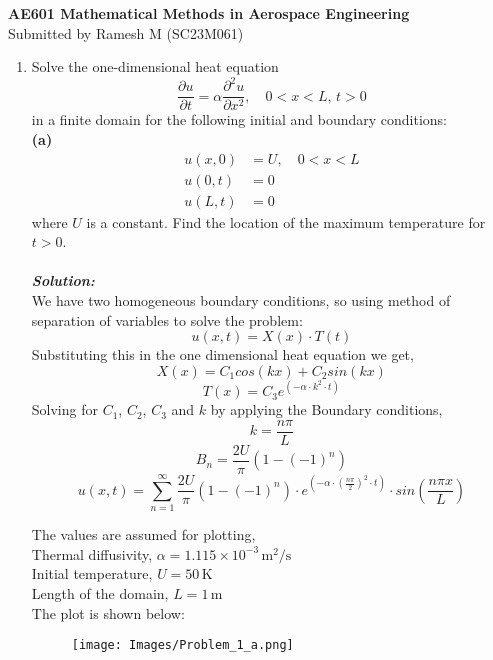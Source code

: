 \documentclass[]{article}
\theoremstyle{definition}
\begin{document}
\begin{center}
{\textbf{\Large AE601 Mathematical Methods in Aerospace Engineering}}\\

\normalsize{Submitted by Ramesh M (SC23M061)}\\
\end{center}

\vspace{0.2 cm}

\begin{enumerate}
\item 
Solve the one-dimensional heat equation
\[
\frac{\partial u}{\partial t} = \alpha \frac{\partial^2 u}{\partial x^2}, \quad 0 < x < L, \, t > 0
\]
in a finite domain for the following initial and boundary conditions:\\
\textbf{(a)}\quad
\begin{align*}
u(x,0) &= U, \quad 0 < x < L \\
u(0,t) &= 0 \\
u(L,t) &= 0
\end{align*}
where \(U\) is a constant. Find the location of the maximum temperature for \(t > 0\).\\
\\
\emph{\textbf{Solution:}}\\
We have two homogeneous boundary conditions, so using method of separation of variables to solve the problem:
\[
u(x,t) = X(x)\cdot T(t)
\]
Substituting this in the one dimensional heat equation we get,
\[
X(x) = C_1cos(kx) + C_2sin(kx)
\]
\[
T(x) = C_3e^{(-\alpha\cdot k^2\cdot t)}
\]
Solving for $C_1$, $C_2$, $C_3$ and $k$ by applying the Boundary conditions,
\[
k = \frac{n\pi}{L}
\]
\[
\boxed{
B_n = \frac{2 U}{\pi}(1 - (-1)^n)
}
\]
\[
\boxed{
u(x,t) = \sum_{n=1}^{\infty} \frac{2 U}{\pi}(1 - (-1)^n)\cdot e^{(-\alpha\cdot (\frac{n\pi}{2})^2\cdot t)}\cdot sin(\frac{n\pi x}{L})
}
\]

The values are assumed for plotting, \\
Thermal diffusivity, $\alpha = 1.115 \times 10^{-3}\, \text{m}^2/\text{s}$ \\
Initial temperature, $U = 50\, \text{K}$ \\
Length of the domain, $L = 1\, \text{m}$ \\
The plot is shown below:\\
\begin{figure}[htbp]
    \centering
    \texttt{[image: Images/Problem\_1\_a.png]}
\end{figure}\\
\pagebreak


\end{enumerate}
\end{document}
